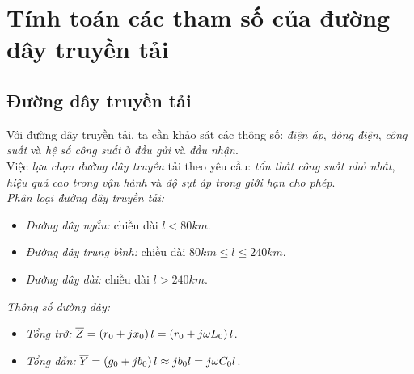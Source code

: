 \section{Tính toán các tham số của đường dây truyền tải}
\subsection{Đường dây truyền tải}
	Với đường dây truyền tải, ta cần khảo sát các thông số: \emph{điện áp}, \emph{dòng điện}, \emph{công suất} và \emph{hệ số công suất} ở \emph{đầu gửi} và \emph{đầu nhận}.\\

	Việc\emph{ lựa chọn đường dây truyền} tải theo yêu cầu: \emph{tổn thất công suất nhỏ nhất}, \emph{hiệu quả cao trong vận hành} và \emph{độ sụt áp trong giới hạn cho phép}.\\
	
	\emph{Phân loại đường dây truyền tải:}
		\begin{itemize}
			\item \emph{Đường dây ngắn:} chiều dài $l <80\unit{km}$.
			
			\item \emph{Đường dây trung bình:} chiều dài $80 \unit{km} \leq l \leq 240 \unit{km}$.
			
			\item \emph{Đường dây dài:} chiều dài $l > 240 \unit{km}$.
		\end{itemize}
		
	\emph{Thông số đường dây:}
		\begin{itemize}
			\item \emph{Tổng trở:} $\overline{Z} = \left({r_0+jx_0}\right)l = \left({r_0+j\omega L_0}\right)l$.
			\item \emph{Tổng dẫn:} $\overline{Y} = \left({g_0+jb_0}\right)l \approx jb_0l =  j\omega C_0 l$.
		\end{itemize}
		
